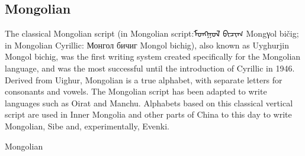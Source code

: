 \subsection{Mongolian}
\newfontfamily{}

The classical Mongolian script (in Mongolian script:{\mongolian ᠮᠣᠩᠭᠣᠯ ᠪᠢᠴᠢᠭ᠌} Mongγol bičig; in Mongolian Cyrillic: Монгол бичиг Mongol bichig), also known as Uyghurjin Mongol bichig, was the first writing system created specifically for the Mongolian language, and was the most successful until the introduction of Cyrillic in 1946. Derived from Uighur, Mongolian is a true alphabet, with separate letters for consonants and vowels. The Mongolian script has been adapted to write languages such as Oirat and Manchu. Alphabets based on this classical vertical script are used in Inner Mongolia and other parts of China to this day to write Mongolian, Sibe and, experimentally, Evenki.

\begin{scriptexample}[]{Mongolian}
\end{scriptexample}